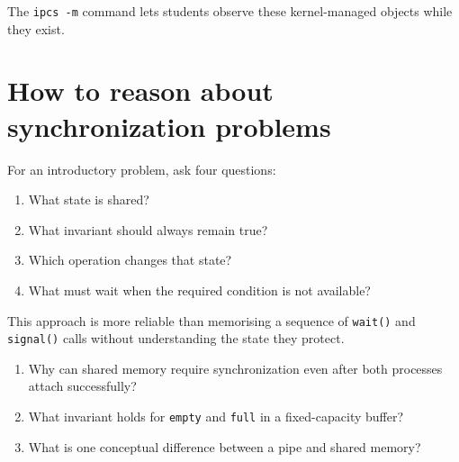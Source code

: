 The \texttt{ipcs -m} command lets students observe these kernel-managed objects while they exist.

\section{How to reason about synchronization problems}
For an introductory problem, ask four questions:
\begin{enumerate}
  \item What state is shared?
  \item What invariant should always remain true?
  \item Which operation changes that state?
  \item What must wait when the required condition is not available?
\end{enumerate}
This approach is more reliable than memorising a sequence of \texttt{wait()} and \texttt{signal()} calls without understanding the state they protect.

\begin{quickcheck}
\begin{enumerate}
  \item Why can shared memory require synchronization even after both processes attach successfully?
  \item What invariant holds for \texttt{empty} and \texttt{full} in a fixed-capacity buffer?
  \item What is one conceptual difference between a pipe and shared memory?
\end{enumerate}
\end{quickcheck}


